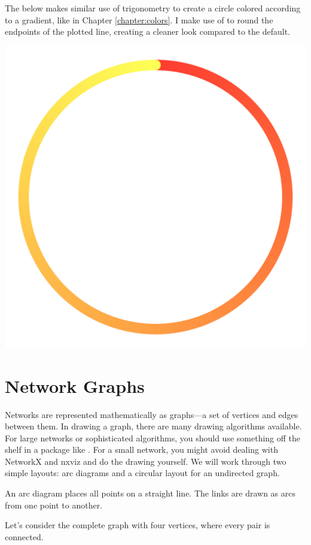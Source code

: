 The below makes similar use of trigonometry to create a circle colored according to a gradient, like in Chapter \ref{chapter:colors}. I make use of  to round the endpoints of the plotted line, creating a cleaner look compared to the default. 


\begin{center}
    \includegraphics[width=.8\textwidth]{figures/mathplots/circle-grad.pdf}
\end{center}

\section{Network Graphs}

Networks are represented mathematically as graphs---a set of vertices and edges between them. In drawing a graph, there are many drawing algorithms available. For large networks or sophisticated algorithms, you should use something off the shelf in a package like . For a small network, you might avoid dealing with NetworkX and nxviz and do the drawing yourself. We will work through two simple layouts: arc diagrams and a circular layout for an undirected graph. 

An arc diagram places all points on a straight line. The links are drawn as arcs from one point to another. 

Let's consider the complete graph with four vertices, where every pair is connected. 

